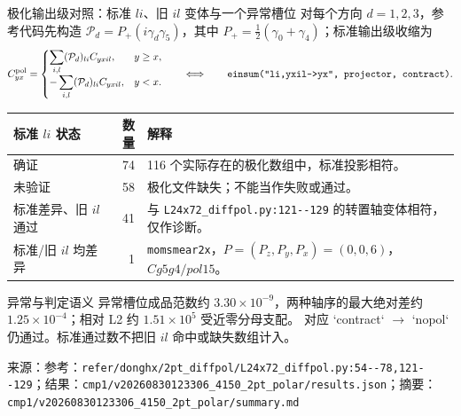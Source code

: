 \documentclass[UTF8,aspectratio=169,11pt]{ctexbeamer}
\newcommand{\source}[1]{\vspace{0.05em}\par{\raggedright\scriptsize\color{muted}来源：#1\par}}
\newcommand{\codepath}[1]{\nolinkurl{#1}}
\newcommand{\verified}{\textcolor{evidence}{确证}}
\newcommand{\unverified}{\textcolor{warning}{未验证}}
\begin{document}
\begin{frame}[t]{极化输出级对照：标准 $li$、旧 $il$ 变体与一个异常槽位}
  \scriptsize
  对每个方向 $d=1,2,3$，参考代码先构造
  $\mathcal P_d=P_+(i\gamma_d\gamma_5)$，其中
  $P_+=\frac12(\gamma_0+\gamma_4)$；标准输出级收缩为
  \[
    C^{\rm pol}_{yx}=\begin{cases}
      \displaystyle\sum_{i,l}(\mathcal P_d)_{li}C_{yxil},&y\ge x,\\
      \displaystyle-\sum_{i,l}(\mathcal P_d)_{li}C_{yxil},&y<x.
    \end{cases}
    \qquad\Longleftrightarrow\qquad
    \texttt{einsum("li,yxil->yx", projector, contract)}.
  \]
  \setlength{\tabcolsep}{3pt}
  \renewcommand{\arraystretch}{1.00}
  \begin{tabularx}{0.96\textwidth}{@{}L r Y@{}}
    \toprule
    标准 $li$ 状态 & 数量 & 解释\\
    \midrule
    \verified & 74 & 116 个实际存在的极化数组中，标准投影相符。\\
    \unverified & 58 & 极化文件缺失；不能当作失败或通过。\\
    标准差异、旧 $il$ 通过 & 41 & 与 \codepath{L24x72_diffpol.py:121--129} 的转置轴变体相符，仅作诊断。\\
    标准/旧 $il$ 均差异 & 1 & \codepath{momsmear2x}，$P=(P_z,P_y,P_x)=(0,0,6)$，$Cg5g4/pol15$。\\
    \bottomrule
  \end{tabularx}
  \vspace{0.08em}
  \begin{block}{异常与判定语义}
    异常槽位成品范数约 $3.30\times10^{-9}$，两种轴序的最大绝对差约
    $1.25\times10^{-4}$；相对 L2 约 $1.51\times10^5$ 受近零分母支配。
    对应 `contract` $\to$ `nopol` 仍通过。标准通过数不把旧 $il$ 命中或缺失数组计入。
  \end{block}
  \source{参考：\codepath{refer/donghx/2pt_diffpol/L24x72_diffpol.py:54--78,121--129}；结果：\codepath{cmp1/v20260830123306_4150_2pt_polar/results.json}；摘要：\codepath{cmp1/v20260830123306_4150_2pt_polar/summary.md}}
\end{frame}
\end{document}
